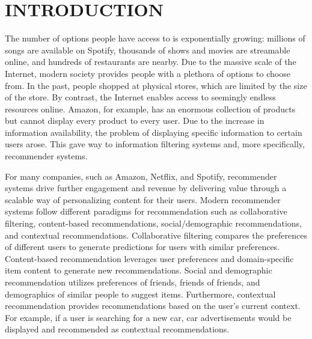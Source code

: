 %
%
%
%


\pagestyle{plain} %

\chapter{INTRODUCTION}

\indent The number of options people have access to is exponentially growing: millions of songs are available on Spotify, thousands of shows and movies are streamable online, and hundreds of restaurants are nearby. Due to the massive scale of the Internet, modern society provides people with a plethora of options to choose from. In the past, people shopped at physical stores, which are limited by the size of the store. By contrast, the Internet enables access to seemingly endless resources online. Amazon, for example, has an enormous collection of products but cannot display every product to every user. Due to the increase in information availability, the problem of displaying specific information to certain users arose. This gave way to information filtering systems and, more specifically, recommender systems.

For many companies, such as Amazon, Netflix, and Spotify, recommender systems drive further engagement and revenue by delivering value through a scalable way of personalizing content for their users. Modern recommender systems follow different paradigms for recommendation such as collaborative filtering, content-based recommendations, social/demographic recommendations, and contextual recommendations. Collaborative filtering compares the preferences of different users to generate predictions for users with similar preferences. Content-based recommendation leverages user preferences and domain-specific item content to generate new recommendations. Social and demographic recommendation utilizes preferences of friends, friends of friends, and demographics of similar people to suggest items. Furthermore, contextual recommendation provides recommendations based on the user's current context. For example, if a user is searching for a new car, car advertisements would be displayed and recommended as contextual recommendations.

